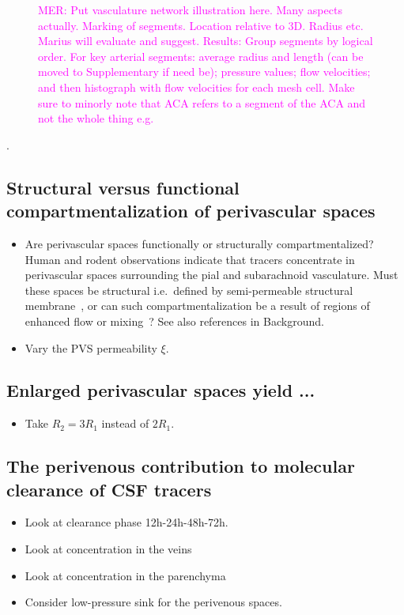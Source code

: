 \documentclass[fleqn,10pt]{wlscirep}
\newcommand{\mer}[1]{\textcolor{magenta}{#1}}
\begin{document}
\begin{figure}
    \caption{\mer{MER: Put vasculature network illustration here. Many aspects actually. Marking of segments. Location relative to 3D. Radius etc. Marius will evaluate and suggest. Results: Group segments by logical order. For key arterial segments: average radius and length (can be moved to Supplementary if need be); pressure values; flow velocities; and then histograph with flow velocities for each mesh cell. Make sure to minorly note that ACA refers to a segment of the ACA and not the whole thing e.g.}}
    \label{fig:pvs}
\end{figure}
.

\subsection*{Structural versus functional compartmentalization of perivascular spaces}

\begin{itemize}
\item
  Are perivascular spaces functionally or structurally
compartmentalized? Human and rodent observations indicate that tracers
concentrate in perivascular spaces surrounding the pial and
subarachnoid vasculature. Must these spaces be structural i.e.~defined
by semi-permeable structural
membrane~\cite{zhang1990interrelationships, zhang1992directional,
  mestre2018flow, eide2024functional}, or can such
compartmentalization be a result of regions of enhanced flow or
mixing~\cite{bedussi2017paravascular, vinje2021brain}? See also
references in Background.
\item
  Vary the PVS permeability $\xi$.
\end{itemize}

\subsection*{Enlarged perivascular spaces yield ...}

\begin{itemize}
  \item Take $R_2 = 3 R_1$ instead of $2 R_1$.
\end{itemize}

\subsection*{The perivenous contribution to molecular clearance of CSF tracers}

\begin{itemize}
\item
  Look at clearance phase 12h-24h-48h-72h.
\item
  Look at concentration in the veins
\item
  Look at concentration in the parenchyma
\item
  Consider low-pressure sink for the perivenous spaces.
\end{itemize}
\end{document}
